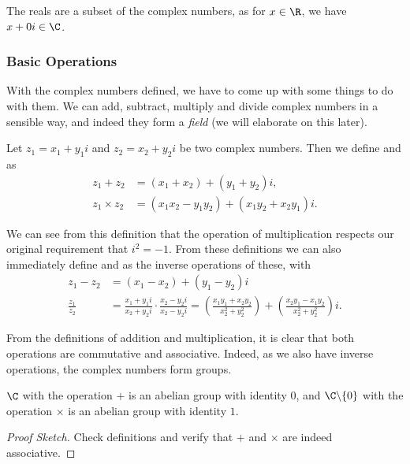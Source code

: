 The reals are a subset of the complex numbers, as for $x \in \R$, we have $x + 0i \in \C$. 

\subsubsection{Basic Operations}

With the complex numbers defined, we have to come up with some things to do with them.
We can add, subtract, multiply and divide complex numbers in a sensible way, and indeed they form a \emph{field} (we will elaborate on this later).

\begin{definition}
	Let $z_1 = x_1 + y_1 i$ and $z_2 = x_2 + y_2 i$ be two complex numbers. Then we define  and  as
	\begin{align*}
		z_1 + z_2 &= (x_1 + x_2) + (y_1 + y_2)i,\\
		z_1 \times z_2 &= (x_1 x_2 - y_1 y_2) + (x_1 y_2 + x_2 y_1)i.
	\end{align*}
\end{definition}

We can see from this definition that the operation of multiplication respects our original requirement that $i^2 = -1$. From these definitions we can also immediately define  and  as the inverse operations of these, with
\begin{align*}
	z_1 - z_2 &= (x_1 - x_2) + (y_1 - y_2)i \\
	\frac{z_1}{z_2} &= \frac{x_1 + y_1 i}{x_2 + y_2 i} \cdot \frac{x_2 - y_2i}{x_2 - y_2 i} = \left(\frac{x_1y_1 + x_2 y_2}{x_2^2 + y_2^2}\right) + \left(\frac{x_2y_1 - x_1 y_2}{x_2^2 + y_2^2}\right)i.
\end{align*}

From the definitions of addition and multiplication, it is clear that both operations are commutative and associative. Indeed, as we also have inverse operations, the complex numbers form groups.

\begin{proposition}[$\C$ is a Group]
	$\C$ with the operation $+$ is an abelian group with identity $0$, and $\C \backslash \{0\}$ with the operation $\times$ is an abelian group with identity $1$.
\end{proposition}
\begin{proof}[Proof Sketch]
	Check definitions and verify that $+$ and $\times$ are indeed associative.
\end{proof}

